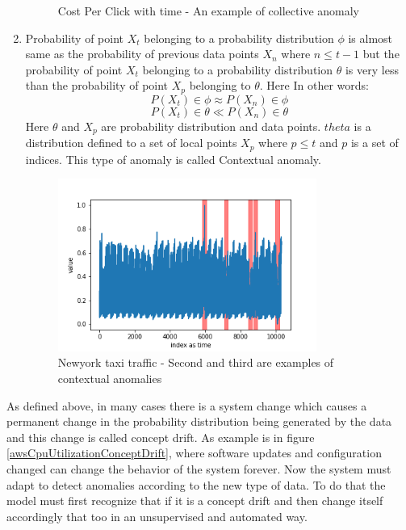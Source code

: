 \documentclass[12pt]{article}
\begin{document}
\begin{enumerate}
\begin{figure}[H]
    \caption{Cost Per Click with time - An example of collective anomaly}
    \label{examleOfCollectiveAnomaly}
\end{figure}
    \item Probability of point $X_t$ belonging to a probability distribution $\phi$ is almost same as the probability of previous data points $X_n$ where $n \leq t-1$ but the probability of point $X_t$ belonging to a probability distribution $\theta$ is very less than the probability of point $X_p$ belonging to $\theta$. Here In other words:\\
    \begin{equation}
        P(X_t) \in \phi  \approx P(X_n) \in \phi 
    \end{equation}
    \begin{equation}
        P(X_t) \in \theta  \ll P(X_n) \in \theta 
    \end{equation}
    Here $\theta$ and  $X_p$ are probability distribution and data points. $theta$ is a distribution defined to a set of local points $X_p$ where $p \leq t$ and $p$ is a set of indices. 
    This type of anomaly is called Contextual anomaly. 
                \begin{figure}[H]
\centering
        \includegraphics[width=0.8\textwidth]{images/dataAnomalies/known/nyc_taxi.png}
    \caption{Newyork taxi traffic  - Second and third are examples of contextual anomalies}
    \label{examleOfPointAnomaly}
\end{figure}
\end{enumerate}
As defined above, in many cases there is a system change which causes a permanent change in the probability distribution being generated by the data and this change is called concept drift. As example is in figure \ref{awsCpuUtilizationConceptDrift}, where software updates and configuration changed can change the behavior of the system forever. Now the system must adapt to detect anomalies according to the new type of data. To do that the model must first recognize that if it is a concept drift and then change itself accordingly that too in an unsupervised and automated way.
\end{document}
